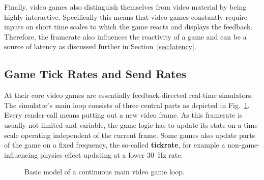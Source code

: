 Finally, video games also distinguish themselves from video material by 
being highly interactive. Specifically this means that video games 
constantly require inputs on short time scales to which the game reacts 
and displays the feedback. Therefore, the framerate also influences the 
reactivity of a game and can be a source of latency as discussed 
further in Section~\ref{sec:latency}.


\subsection{Game Tick Rates and Send Rates}

At their core video games are essentially feedback-directed real-time 
simulators. The simulator's main loop consists of three central parts 
as depicted in Fig.~\ref{alg:gameloop1}. Every render-call means 
putting out a new video frame. As this framerate is usually not limited 
and variable, the game logic has to update its state on a time-scale 
operating independent of the current frame. Some games also update 
parts of the game on a fixed frequency, the so-called 
\textbf{tickrate}, for example a non-game-influencing physics effect 
updating at a lower \SI{30}{\hertz} rate.


\begin{figure}[!t]
\centering
\removelatexerror
\begin{algorithm}[H]
\end{algorithm}
\caption{Basic model of a continuous main video game loop.}
\label{alg:gameloop1}
\end{figure}

